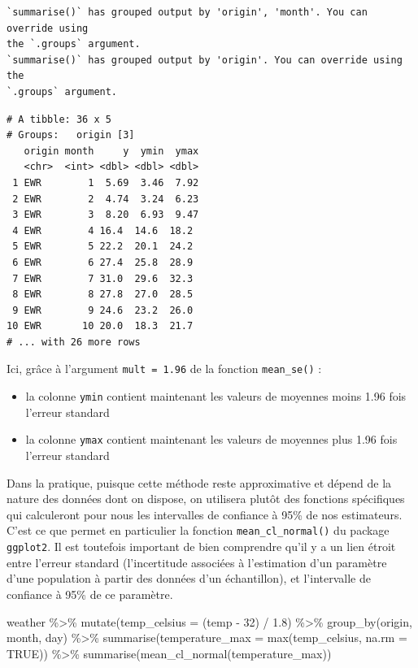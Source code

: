 \documentclass[
  a4paper,
  DIV=11,
  numbers=noendperiod,
  oneside]{scrreprt}
\newenvironment{Shaded}{}{}
\newcommand{\AttributeTok}[1]{\textcolor[rgb]{0.84,0.23,0.29}{#1}}
\newcommand{\ConstantTok}[1]{\textcolor[rgb]{0.00,0.36,0.77}{#1}}
\newcommand{\DecValTok}[1]{\textcolor[rgb]{0.00,0.36,0.77}{#1}}
\newcommand{\FloatTok}[1]{\textcolor[rgb]{0.00,0.36,0.77}{#1}}
\newcommand{\FunctionTok}[1]{\textcolor[rgb]{0.44,0.26,0.76}{#1}}
\newcommand{\NormalTok}[1]{\textcolor[rgb]{0.14,0.16,0.18}{#1}}
\newcommand{\SpecialCharTok}[1]{\textcolor[rgb]{0.00,0.36,0.77}{#1}}
\providecommand{\tightlist}{%
  \setlength{\itemsep}{0pt}\setlength{\parskip}{0pt}}\usepackage{longtable,booktabs,array}
\begin{document}
\begin{verbatim}
`summarise()` has grouped output by 'origin', 'month'. You can override using
the `.groups` argument.
`summarise()` has grouped output by 'origin'. You can override using the
`.groups` argument.
\end{verbatim}

\begin{verbatim}
# A tibble: 36 x 5
# Groups:   origin [3]
   origin month     y  ymin  ymax
   <chr>  <int> <dbl> <dbl> <dbl>
 1 EWR        1  5.69  3.46  7.92
 2 EWR        2  4.74  3.24  6.23
 3 EWR        3  8.20  6.93  9.47
 4 EWR        4 16.4  14.6  18.2 
 5 EWR        5 22.2  20.1  24.2 
 6 EWR        6 27.4  25.8  28.9 
 7 EWR        7 31.0  29.6  32.3 
 8 EWR        8 27.8  27.0  28.5 
 9 EWR        9 24.6  23.2  26.0 
10 EWR       10 20.0  18.3  21.7 
# ... with 26 more rows
\end{verbatim}

Ici, grâce à l'argument \texttt{mult\ =\ 1.96} de la fonction
\texttt{mean\_se()} :

\begin{itemize}
\tightlist
\item
  la colonne \texttt{ymin} contient maintenant les valeurs de moyennes
  moins 1.96 fois l'erreur standard
\item
  la colonne \texttt{ymax} contient maintenant les valeurs de moyennes
  plus 1.96 fois l'erreur standard
\end{itemize}

Dans la pratique, puisque cette méthode reste approximative et dépend de
la nature des données dont on dispose, on utilisera plutôt des fonctions
spécifiques qui calculeront pour nous les intervalles de confiance à
95\% de nos estimateurs. C'est ce que permet en particulier la fonction
\texttt{mean\_cl\_normal()} du package \texttt{ggplot2}. Il est
toutefois important de bien comprendre qu'il y a un lien étroit entre
l'erreur standard (l'incertitude associées à l'estimation d'un paramètre
d'une population à partir des données d'un échantillon), et l'intervalle
de confiance à 95\% de ce paramètre.

\begin{Shaded}
\begin{Highlighting}[]
\NormalTok{weather }\SpecialCharTok{\%\textgreater{}\%} 
  \FunctionTok{mutate}\NormalTok{(}\AttributeTok{temp\_celsius =}\NormalTok{ (temp }\SpecialCharTok{{-}} \DecValTok{32}\NormalTok{) }\SpecialCharTok{/} \FloatTok{1.8}\NormalTok{) }\SpecialCharTok{\%\textgreater{}\%} 
  \FunctionTok{group\_by}\NormalTok{(origin, month, day) }\SpecialCharTok{\%\textgreater{}\%} 
  \FunctionTok{summarise}\NormalTok{(}\AttributeTok{temperature\_max =} \FunctionTok{max}\NormalTok{(temp\_celsius, }\AttributeTok{na.rm =} \ConstantTok{TRUE}\NormalTok{)) }\SpecialCharTok{\%\textgreater{}\%} 
  \FunctionTok{summarise}\NormalTok{(}\FunctionTok{mean\_cl\_normal}\NormalTok{(temperature\_max))}
\end{Highlighting}
\end{Shaded}
\end{document}
